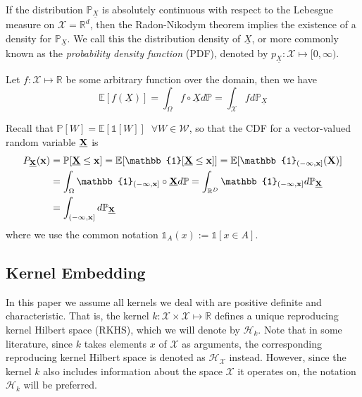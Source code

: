 \documentclass[twoside]{article} \usepackage{aistats2017}
\theoremstyle{definition}
\theoremstyle{remark}
\newcommand{\rv}[1]{\underline{#1}}
\newcommand{\extra}[1]{{\color{ForestGreen} #1}}
\begin{document}
		
		If the distribution $\mathbb{P}_{\rv{X}}$ is absolutely continuous with respect to the Lebesgue measure on $\mathcal{X} = \mathbb{R}^{d}$, then the Radon-Nikodym theorem implies the existence of a density for $\mathbb{P}_{\rv{X}}$. We call this the distribution density of $\rv{X}$, or more commonly known as the \textit{probability density function} (PDF), denoted by $p_{\rv{X}}: \mathcal{X} \mapsto [0, \infty)$.
		
		Let $f : \mathcal{X} \mapsto \mathbb{R}$ be some arbitrary function over the domain, then we have
		\begin{equation}
			\mathbb{E}[f(\rv{X})] = \int_{\Omega} f \circ \rv{X} d \mathbb{P} = \int_{\mathcal{X}} f d \mathbb{P}_{\rv{X}}
		\label{eq:functional_expectation}
		\end{equation}
		
		Recall that $\mathbb{P}[W] = \mathbb{E}[\mathbb{1}[W]] \;\; \forall W \in \mathcal{W}$, so that the CDF for a vector-valued random variable $\bvec{\rv{X}}$ is
		\begin{equation}
			\begin{aligned}
				P_{\bvec{\rv{X}}}(\bvec{x}) &= \mathbb{P}[\bvec{\rv{X}} \leq \bvec{x}] = \mathbb{E}[\mathbb{1}[\bvec{\rv{X}} \leq \bvec{x}]] = \mathbb{E}[\mathbb{1}_{(-\bvec{\infty}, \bvec{x}]}(\bvec{X})] \\
				&= \int_{\Omega} \mathbb{1}_{(-\bvec{\infty}, \bvec{x}]} \circ \bvec{\rv{X}} d \mathbb{P} = \int_{\mathbb{R}^{D}} \mathbb{1}_{(-\bvec{\infty}, \bvec{x}]} d \mathbb{P}_{\bvec{\rv{X}}} \\
				&= \int_{(-\bvec{\infty}, \bvec{x}]} d \mathbb{P}_{\bvec{\rv{X}}}
			\end{aligned}
		\label{eq:cdf_integral}
		\end{equation}
		where we use the common notation $\mathbb{1}_{A}(x) := \mathbb{1}[x \in A]$.
		
	\subsection{Kernel Embedding}
	\label{sec:background:kernel_embedding}
	
		In this paper we assume all kernels we deal with are positive definite and characteristic. That is, the kernel $k : \mathcal{X} \times \mathcal{X} \mapsto \mathbb{R}$ defines a unique reproducing kernel Hilbert space (RKHS), which we will denote by $\mathcal{H}_{k}$. \extra{Note that in some literature, since $k$ takes elements $x$ of $\mathcal{X}$ as arguments, the corresponding reproducing kernel Hilbert space is denoted as $\mathcal{H}_{\mathcal{X}}$ instead. However, since the kernel $k$ also includes information about the space $\mathcal{X}$ it operates on, the notation $\mathcal{H}_{k}$ will be preferred.}
		 
\end{document}
